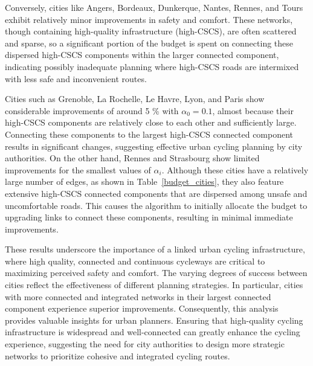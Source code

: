 \documentclass[lettersize,journal]{IEEEtran}
\begin{document}
Conversely, cities like Angers, Bordeaux, Dunkerque, Nantes, Rennes, and Tours exhibit relatively minor improvements in safety and comfort. These networks, though containing high-quality infrastructure (high-CSCS), are often scattered and sparse, so a significant portion of the budget is spent on connecting these dispersed high-CSCS components within the larger connected component, indicating possibly inadequate planning where high-CSCS roads are intermixed with less safe and inconvenient routes.

Cities such as Grenoble, La Rochelle, Le Havre, Lyon, and Paris show considerable improvements of around 5 \% with $\alpha_{0} =0.1$, almost because their high-CSCS components are relatively close to each other and sufficiently large. Connecting these components to the largest high-CSCS connected component results in significant changes, suggesting effective urban cycling planning by city authorities. On the other hand, Rennes and Strasbourg show limited improvements for the smallest values of $\alpha_{i}$. Although these cities have a relatively large number of edges, as shown in Table~\ref{budget_cities}, they also feature extensive high-CSCS connected components that are dispersed among unsafe and uncomfortable roads. This causes the algorithm to initially allocate the budget to upgrading links to connect these components, resulting in minimal immediate improvements. 

These results underscore the importance of a linked urban cycling infrastructure, where high quality, connected and continuous cycleways are critical to maximizing perceived safety and comfort. The varying degrees of success between cities reflect the effectiveness of different planning strategies. In particular, cities with more connected and integrated networks in their largest connected component experience superior improvements. Consequently, this analysis provides valuable insights for urban planners. Ensuring that high-quality cycling infrastructure is widespread and well-connected can greatly enhance the cycling experience, suggesting the need for city authorities to design more strategic networks to prioritize cohesive and integrated cycling routes.
\end{document}
